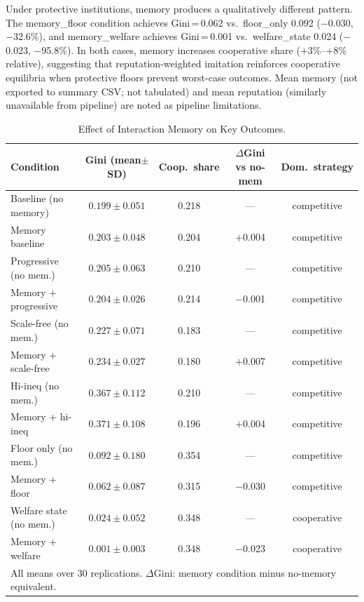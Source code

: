 \documentclass[12pt, letterpaper]{article}
\begin{document}
Under protective institutions, memory produces a qualitatively different
pattern. The memory\_floor condition achieves Gini\,=\,0.062
vs.\ floor\_only 0.092 ($-$0.030, $-$32.6\%), and memory\_welfare
achieves Gini\,=\,0.001 vs.\ welfare\_state 0.024 ($-$0.023, $-$95.8\%).
In both cases, memory increases cooperative share ($+$3\%--$+$8\%
relative), suggesting that reputation-weighted imitation reinforces
cooperative equilibria when protective floors prevent worst-case
outcomes. Mean memory (not exported to summary CSV; not tabulated) and
mean reputation (similarly unavailable from pipeline) are noted as
pipeline limitations.

\begin{table}[h]
\centering
\caption{Effect of Interaction Memory on Key Outcomes.}
\label{tab:memory}
\small
\begin{tabular}{lcccc}
\toprule
Condition & Gini (mean$\pm$SD) & Coop.\ share & $\Delta$Gini vs no-mem & Dom.\ strategy \\
\midrule
Baseline (no memory)     & $0.199 \pm 0.051$ & 0.218 & ---           & competitive \\
Memory baseline          & $0.203 \pm 0.048$ & 0.204 & $+$0.004      & competitive \\
Progressive (no mem.)    & $0.205 \pm 0.063$ & 0.210 & ---           & competitive \\
Memory + progressive     & $0.204 \pm 0.026$ & 0.214 & $-$0.001      & competitive \\
Scale-free (no mem.)     & $0.227 \pm 0.071$ & 0.183 & ---           & competitive \\
Memory + scale-free      & $0.234 \pm 0.027$ & 0.180 & $+$0.007      & competitive \\
Hi-ineq (no mem.)        & $0.367 \pm 0.112$ & 0.210 & ---           & competitive \\
Memory + hi-ineq         & $0.371 \pm 0.108$ & 0.196 & $+$0.004      & competitive \\
Floor only (no mem.)     & $0.092 \pm 0.180$ & 0.354 & ---           & competitive \\
Memory + floor           & $0.062 \pm 0.087$ & 0.315 & $-$0.030      & competitive \\
Welfare state (no mem.)  & $0.024 \pm 0.052$ & 0.348 & ---           & cooperative \\
Memory + welfare         & $0.001 \pm 0.003$ & 0.348 & $-$0.023      & cooperative \\
\bottomrule
\multicolumn{5}{l}{\small All means over 30 replications. $\Delta$Gini: memory condition minus no-memory equivalent.}
\end{tabular}
\end{table}
\end{document}
